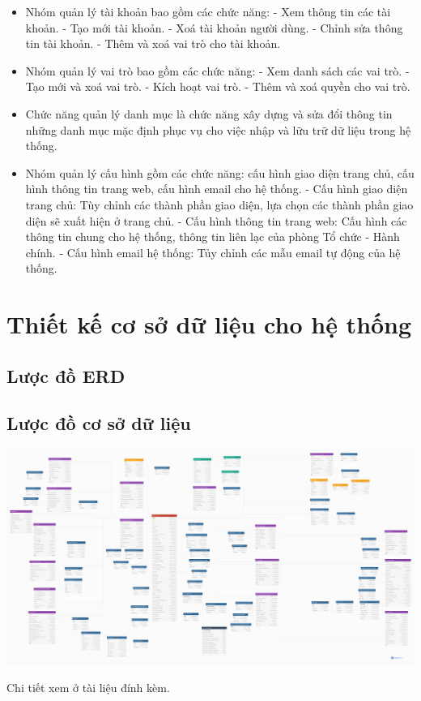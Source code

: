 \begin{itemize}
    \item Nhóm quản lý tài khoản bao gồm các chức năng:
        \subitem - Xem thông tin các tài khoản.
        \subitem - Tạo mới tài khoản.
        \subitem - Xoá tài khoản người dùng.
        \subitem - Chỉnh sửa thông tin tài khoản.
        \subitem - Thêm và xoá vai trò cho tài khoản.
    \item Nhóm quản lý vai trò bao gồm các chức năng:
        \subitem - Xem danh sách các vai trò.
        \subitem - Tạo mới và xoá vai trò.
        \subitem - Kích hoạt vai trò.
        \subitem - Thêm và xoá quyền cho vai trò.
    \item Chức năng quản lý danh mục là chức năng xây dựng và sửa đổi thông tin những danh mục mặc định phục vụ cho việc nhập và lữu trữ dữ liệu trong hệ thống.
    \item Nhóm quản lý cấu hình gồm các chức năng: cấu hình giao diện trang chủ, cấu hình thông tin trang web, cấu hình email cho hệ thống.
        \subitem - Cấu hình giao diện trang chủ: Tùy chỉnh các thành phần giao diện, lựa chọn các thành phần giao diện sẽ xuất hiện ở trang chủ.
        \subitem - Cấu hình thông tin trang web: Cấu hình các thông tin chung cho hệ thống, thông tin liên lạc của phòng Tổ chức - Hành chính.
        \subitem - Cấu hình email hệ thống: Tủy chỉnh các mẫu email tự động của hệ thống.
\end{itemize}
\section{Thiết kế cơ sở dữ liệu cho hệ thống}
\subsection{Lược đồ ERD}
\subsection{Lược đồ cơ sở dữ liệu}
\begin{center}
  \captionsetup{type=figure}
  \includegraphics[width=15cm]{img/Screen/dbdiagram.png}
\end{center}
Chi tiết xem ở tài liệu đính kèm.